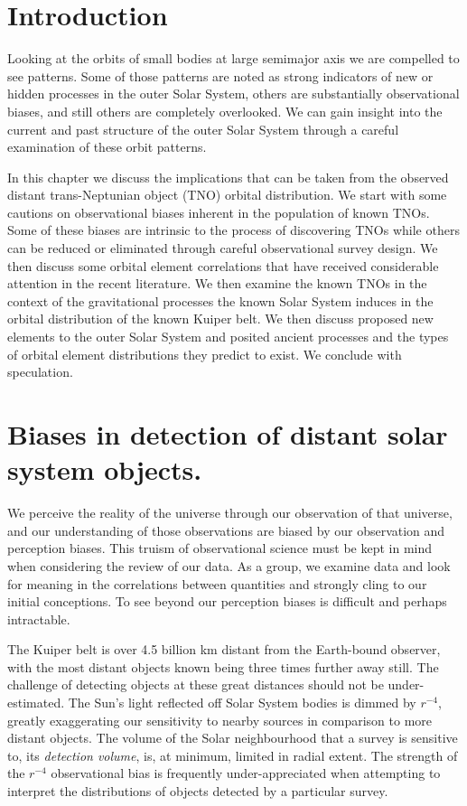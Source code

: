 \documentclass[preprint]{aastex62}
\begin{document}
\section{Introduction}

Looking at the orbits of small bodies at large semimajor axis we are compelled to see
patterns. Some of those patterns are noted as strong
indicators of new or hidden processes in the outer Solar System,
others are substantially observational biases, and still others are
completely overlooked. We can gain insight into the current and past
structure of the outer Solar System through a careful examination of
these orbit patterns.

In this chapter we discuss the implications that can be taken from the observed distant trans-Neptunian object (TNO) orbital distribution.  We start with some cautions on observational biases inherent in the population of known TNOs.  Some of these biases are intrinsic to the process of discovering TNOs while others can be reduced or eliminated through careful observational survey design. We then discuss some orbital element correlations that have received considerable attention in the recent literature. We then examine the known TNOs in the context of the gravitational processes the known Solar System induces in the orbital distribution of the known Kuiper belt.  We then discuss proposed new elements to the outer Solar System and posited ancient processes and the types of orbital element distributions they predict to exist.  We conclude with speculation.

\section{Biases in detection of distant solar system objects.}
\label{sec:intro}

We perceive the reality of the universe through our observation of that universe, and our understanding of those observations are biased by our observation and perception biases. This truism of observational science must be kept in mind when considering the review of our data. As a group, we examine data and look for meaning in the correlations between quantities and strongly cling to our initial conceptions.  To see beyond our perception biases is difficult and perhaps intractable. 

The Kuiper belt is over 4.5 billion km distant from the Earth-bound observer, with the most distant objects known being three times further away still.  The challenge of detecting objects at these great distances should not be under-estimated.  The Sun's light reflected off Solar System bodies is dimmed by $r^{-4}$, greatly exaggerating our sensitivity to nearby sources in comparison to more distant objects.  The volume of the Solar neighbourhood that a survey is sensitive to, its {\it detection volume},  is, at minimum, limited in radial extent. The strength of the $r^{-4}$ observational bias is frequently under-appreciated when attempting to interpret the distributions of objects detected by a particular survey.
\end{document}
